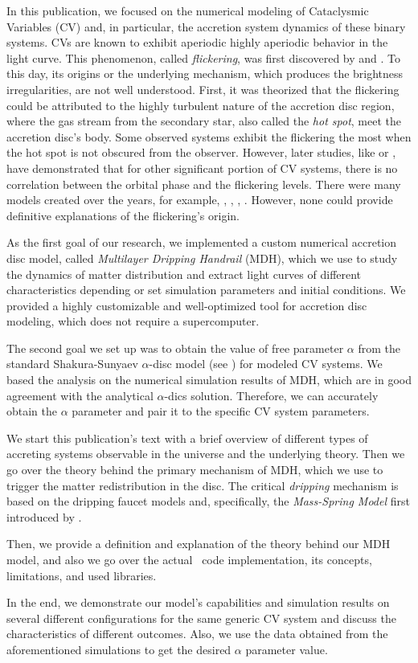 In this publication, we focused on the numerical modeling of Cataclysmic Variables (CV) and, in particular, the accretion system dynamics of these binary systems. CVs are known to exhibit aperiodic highly aperiodic behavior in the light curve. This phenomenon, called \emph{flickering}, was first discovered by \citep{henize1949} and \citep{lenouvel1954}. To this day, its origins or the underlying mechanism, which produces the brightness irregularities, are not well understood. First, it was theorized that the flickering could be attributed to the highly turbulent nature of the accretion disc region, where the gas stream from the secondary star, also called the \emph{hot spot}, meet the accretion disc's body. Some observed systems exhibit the flickering the most when the hot spot is not obscured from the observer. However, later studies, like \citep{patterson1981} or \citep{wood1986}, have demonstrated that for other significant portion of CV systems, there is no correlation between the orbital phase and the flickering levels. There were many models created over the years, for example, \citep{dobrotka2012}, \citep{kley1997}, \citep{lyubarskii1997}, \citep{yonehara1997}. However, none could provide definitive explanations of the flickering's origin.  

As the first goal of our research, we implemented a custom numerical accretion disc model, called \emph{Multilayer Dripping Handrail} (MDH), which we use to study the dynamics of matter distribution and extract light curves of different characteristics depending or set simulation parameters and initial conditions. We provided a highly customizable and well-optimized tool for accretion disc modeling, which does not require a supercomputer. 

The second goal we set up was to obtain the value of free parameter $\alpha$ from the standard Shakura-Sunyaev $\alpha$-disc model (see \citep{shakura1973}) for modeled CV systems. We based the analysis on the numerical simulation results of MDH, which are in good agreement with the analytical $\alpha$-dics solution. Therefore, we can accurately obtain the $\alpha$ parameter and pair it to the specific CV system parameters. 

We start this publication's text with a brief overview of different types of accreting systems observable in the universe and the underlying theory. Then we go over the theory behind the primary mechanism of MDH, which we use to trigger the matter redistribution in the disc. The critical \emph{dripping} mechanism is based on the dripping faucet models and, specifically, the \emph{Mass-Spring Model} first introduced by \citep{shaw1984}. 

Then, we provide a definition and explanation of the theory behind our MDH model, and also we go over the actual \CC\ code implementation, its concepts, limitations, and used libraries. 

In the end, we demonstrate our model's capabilities and simulation results on several different configurations for the same generic CV system and discuss the characteristics of different outcomes. Also, we use the data obtained from the aforementioned simulations to get the desired $\alpha$ parameter value. 
